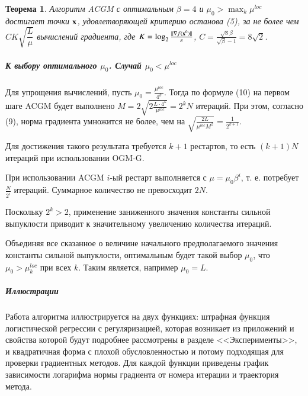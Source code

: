 \documentclass{crm-article}
\newtheorem{theorems}{Теорема}
\begin{document}
\begin{theorems}
Алгоритм ACGM с оптимальным $\beta=4$ и $\mu_0>\max_k \mu^{loc}$ достигает точки ${\bf x}$, удовлетворяющей критерию останова (5), за не более чем $CK \sqrt{\dfrac{L}{\mu}}$ вычислений градиента, где $K=\log_2\frac{||\nabla f({\bf x}^0)||}{\varepsilon}$, $C=\frac{\sqrt{8}\beta}{\sqrt{\beta}-1}=8\sqrt{2}$.
\end{theorems}

\subparagraph{К выбору оптимального $\mu_0$. Случай $\mu_0<\mu^{loc}$}

Для упрощения вычислений, пусть $\mu_0 = \frac{\mu^{loc}}{4^k}$. Тогда по формуле (10) на первом шаге ACGM будет выполнено $M=2\sqrt{2\frac{L\cdot 4^k}{\mu^{loc}}} = 2^kN$ итераций. При этом, согласно (9), норма градиента умножится не более, чем на $\sqrt{\frac{2L}{\mu^{loc} M^2}} = \frac{1}{2^{k+1}}$.

Для достижения такого результата требуется $k+1$ рестартов, то есть $(k+1)N$ итераций при использовании OGM-G.

При использовании ACGM $i$-ый рестарт выполняется с $\mu = \mu_0\beta^i$, т. е. потребует $\frac{N}{2^i}$ итераций. Суммарное количество не превосходит $2N$.

Поскольку $2^k>2$, применение заниженного значения константы сильной выпуклости приводит к значительному увеличению количества итераций.

Объединяя все сказанное о величине начального предполагаемого значения константы сильной выпуклости, оптимальным будет такой выбор $\mu_0$, что $\mu_0>\mu_k^{loc}$ при всех $k$. Таким является, например $\mu_0=L$.

\subparagraph{Иллюстрации}

Работа алгоритма иллюстрируется на двух функциях: штрафная функция логистической регрессии с регуляризацией, которая возникает из приложений и свойства которой будут подробнее рассмотрены в разделе <<Эксперименты>>, и квадратичная форма с плохой обусловленностью и потому подходящая для проверки градиентных методов. Для каждой функции приведены график зависимости логарифма нормы градиента от номера итерации и траектория метода.
\end{document}
